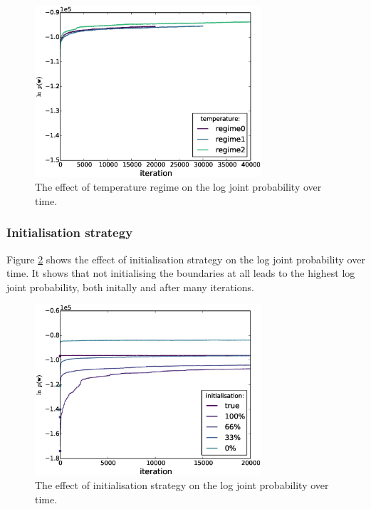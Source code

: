\begin{figure}
  \centering
    \includegraphics[width=0.75\textwidth]{images/temperature-log_prob}
  \caption{The effect of temperature regime on the log joint probability over time.}
  \label{fig:temp_logprob}
\end{figure}

\subsubsection{Initialisation strategy}

Figure \ref{fig:init_logprob} shows the effect of initialisation strategy on the log joint probability over time. It shows that not initialising the boundaries at all leads to the highest log joint probability, both initally and after many iterations.

\begin{figure}
  \centering
    \includegraphics[width=0.75\textwidth]{images/initialisation-log_prob}
  \caption{The effect of initialisation strategy on the log joint probability over time.}
  \label{fig:init_logprob}
\end{figure}

